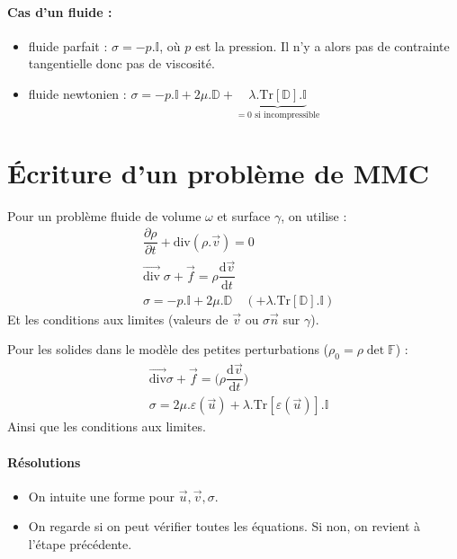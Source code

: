 \documentclass{article}
\newcommand{\deriv}{\mathrm{d}}
\begin{document}
\paragraph{Cas d'un fluide :}
\begin{itemize}
\item fluide parfait : $\sigma = -p . \mathbb{I}$, où $p$ est la pression. Il n'y a alors pas de contrainte tangentielle donc pas de viscosité.
\item fluide newtonien : $\sigma = -p.\mathbb{I} + 2 \mu .\mathbb{D} + \underbrace{\lambda.\text{Tr}[\mathbb{D}].\mathbb{I}}_{=0\text{ si incompressible}}$
\end{itemize}

\section{Écriture d'un problème de MMC}
Pour un problème fluide de volume $\omega$ et surface $\gamma$, on utilise :
\begin{align*}
& \dfrac{\partial \rho}{\partial t} + \text{div}(\rho.\vec{v}) = 0\\
& \overrightarrow{\text{div}}\; \sigma + \vec{f} = \rho\dfrac{\deriv \vec{v}}{\deriv t}\\
& \sigma = -p.\mathbb{I} + 2 \mu.\mathbb{D} \quad ( + \lambda. \text{Tr}[\mathbb{D}].\mathbb{I})
\end{align*}
Et les conditions aux limites (valeurs de $\vec{v}$ ou $\sigma \vec{n}$ sur $\gamma$).
\bigskip

Pour les solides dans le modèle des petites perturbations ($\rho_0 = \rho \det \mathbb{F}$) :
\begin{align*}
& \overrightarrow{\text{div}} \sigma + \vec{f} = \Big(\rho \dfrac{\deriv \vec{v}}{\deriv t} \Big)\\
& \sigma = 2\mu.\varepsilon (\vec{u}) + \lambda .\text{Tr}[\varepsilon(\vec{u})].\mathbb{I}
\end{align*}
Ainsi que les conditions aux limites.

\paragraph{Résolutions}
\begin{itemize}[label=$\star$]
\item On intuite une forme pour $\vec{u}, \vec{v}, \sigma$.
\item On regarde si on peut vérifier toutes les équations. Si non, on revient à l'étape précédente. 
\end{itemize}
\end{document}
